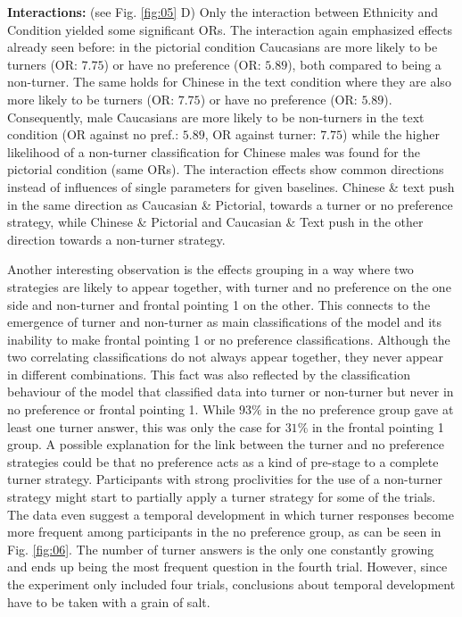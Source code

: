 \documentclass{frontiersSCNS} %
\begin{document}
\textbf{Interactions:} (see Fig. \ref{fig:05} D)
Only the interaction between Ethnicity and Condition yielded some significant ORs. The interaction again emphasized effects already seen before: in the pictorial condition Caucasians are more likely to be turners (OR: $7.75$) or have no preference (OR: $5.89$), both compared to being a non-turner. The same holds for Chinese in the text condition where they are also more likely to be turners (OR: $7.75$) or have no preference (OR: $5.89$). Consequently, male Caucasians are more likely to be non-turners in the text condition (OR against no pref.: $5.89$, OR against turner: $7.75$) while the higher likelihood of a non-turner classification for Chinese males was found for the pictorial condition (same ORs). The interaction effects show common directions instead of influences of single parameters for given baselines. Chinese \& text push in the same direction as Caucasian \& Pictorial, towards a turner or no preference strategy, while Chinese \& Pictorial and Caucasian \& Text push in the other direction towards a non-turner strategy.

Another interesting observation is the effects grouping in a way where two strategies are likely to appear together, with turner and no preference on the one side and non-turner and frontal pointing 1 on the other. This connects to the emergence of turner and non-turner as main classifications of the model and its inability to make frontal pointing 1 or no preference classifications. Although the two correlating classifications do not always appear together, they never appear in different combinations. This fact was also reflected by the classification behaviour of the model that classified data into turner or non-turner but never in no preference or frontal pointing 1. While $93\%$ in the no preference group gave at least one turner answer, this was only the case for $31\%$ in the frontal pointing 1 group.
A possible explanation for the link between the turner and no preference strategies could be that no preference acts as a kind of pre-stage to a complete turner strategy. Participants with strong proclivities for the use of a non-turner strategy might start to partially apply a turner strategy for some of the trials.
The data even suggest a temporal development in which turner responses become more frequent among participants in the no preference group, as can be seen in Fig. \ref{fig:06}. The number of turner answers is the only one constantly growing and ends up being the most frequent question in the fourth trial. However, since the experiment only included four trials, conclusions about temporal development have to be taken with a grain of salt.
\end{document}
